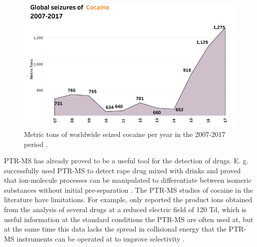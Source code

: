 \begin{figure}[ht]
\centering
\includegraphics[width=0.8\linewidth]{pics/cocaine-chapter/UN_coc.png}
\caption{Metric tons  of worldwide seized cocaine per year in the 2007-2017 period \cite{united2019world}.}
\label{fig:coc_UN}
\end{figure}

PTR-MS has already proved to be a useful tool for the detection of drugs. 
%
E. g. 
\citeauthor{doi:10.1002/jms.2993} successfully  used PTR-MS to detect rape drug mixed with drinks  and \citeauthor{lanza2013distinguishing} proved that ion-molecule processes can be manipulated to differentiate between isomeric substances without initial pre-separation \cite{doi:10.1002/jms.2993,lanza2013distinguishing}.
%
%
The  PTR-MS studies of cocaine in the literature have  limitations. 
%
For example,  \citeauthor{Agarwal2011} only reported the product ions obtained from the analysis of several drugs at a reduced electric field of 120 Td, which is useful information at the standard conditions the PTR-MS are often used at, but at the same time this data lacks the spread in collisional energy that the  PTR-MS instruments can be operated at to improve selectivity \cite{Agarwal2011}.



